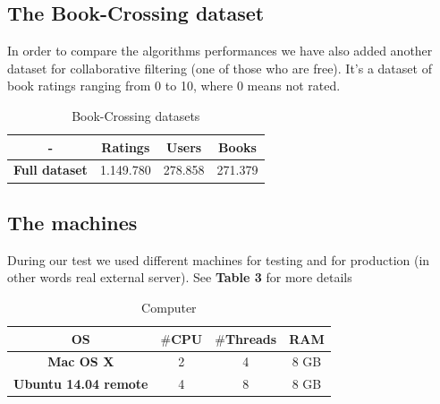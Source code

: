 \documentclass{sig-alternate-05-2015}
\begin{document}
\subsection{The Book-Crossing dataset}
In order to compare the algorithms performances we have also added another dataset
for collaborative filtering (one of those who are free). It's a dataset of
book ratings ranging from 0 to 10, where 0 means not rated.
\begin{table}
\centering
\caption{Book-Crossing datasets}
\begin{tabular}{|c|c|c|c|} \hline
-  & \textbf{Ratings} & \textbf{Users} & \textbf{Books}\\ \hline
\textbf{Full dataset} & 1.149.780 & 278.858 & 271.379 \\ \hline
\end{tabular}
\end{table}


\subsection{The machines}
During our test we used different machines for testing and for production (in other
words real external server). See \textbf{Table 3} for more details\\
\begin{table}
\centering
\caption{Computer}
\begin{tabular}{|c|c|c|c|} \hline
\textbf{OS} & \textbf{$\#$CPU} & \textbf{$\#$Threads} & \textbf{RAM}\\ \hline
\textbf{Mac OS X} & 2 & 4 & 8 GB \\ \hline
\textbf{Ubuntu 14.04 remote} & 4 & 8 & 8 GB  \\ \hline
\end{tabular}
\end{table}
\end{document}
